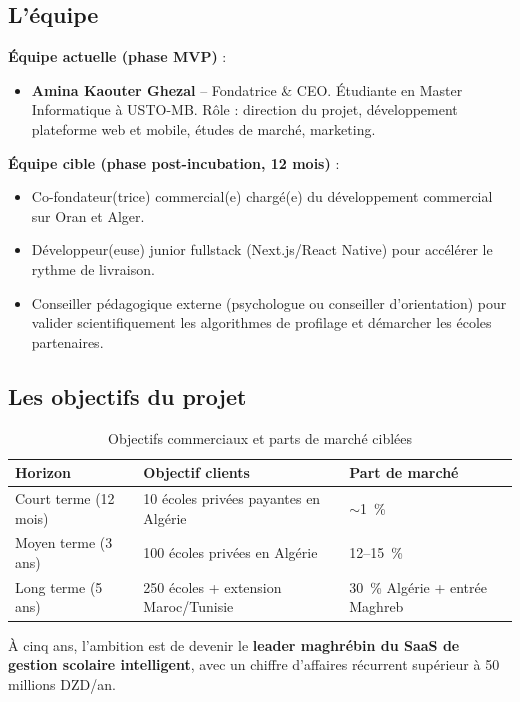 \documentclass[12pt,a4paper,oneside]{report}
\begin{document}
\subsection{L'équipe}

\textbf{Équipe actuelle (phase MVP)} :
\begin{itemize}
  \item \textbf{Amina Kaouter Ghezal} -- Fondatrice \& CEO. Étudiante en Master Informatique à USTO-MB. Rôle : direction du projet, développement plateforme web et mobile, études de marché, marketing.
\end{itemize}

\textbf{Équipe cible (phase post-incubation, 12 mois)} :
\begin{itemize}
  \item Co-fondateur(trice) commercial(e) chargé(e) du développement commercial sur Oran et Alger.
  \item Développeur(euse) junior fullstack (Next.js/React Native) pour accélérer le rythme de livraison.
  \item Conseiller pédagogique externe (psychologue ou conseiller d'orientation) pour valider scientifiquement les algorithmes de profilage et démarcher les écoles partenaires.
\end{itemize}

\subsection{Les objectifs du projet}

\begin{table}[H]
\centering
\caption{Objectifs commerciaux et parts de marché ciblées}
\label{tab:objectifs}
\begin{tabular}{lll}
\toprule
\textbf{Horizon} & \textbf{Objectif clients} & \textbf{Part de marché} \\
\midrule
Court terme (12 mois) & 10 écoles privées payantes en Algérie & $\sim$1~\% \\
Moyen terme (3 ans) & 100 écoles privées en Algérie & 12--15~\% \\
Long terme (5 ans) & 250 écoles + extension Maroc/Tunisie & 30~\% Algérie + entrée Maghreb \\
\bottomrule
\end{tabular}
\end{table}

À cinq ans, l'ambition est de devenir le \textbf{leader maghrébin du SaaS de gestion scolaire intelligent}, avec un chiffre d'affaires récurrent supérieur à 50 millions DZD/an.
\end{document}
